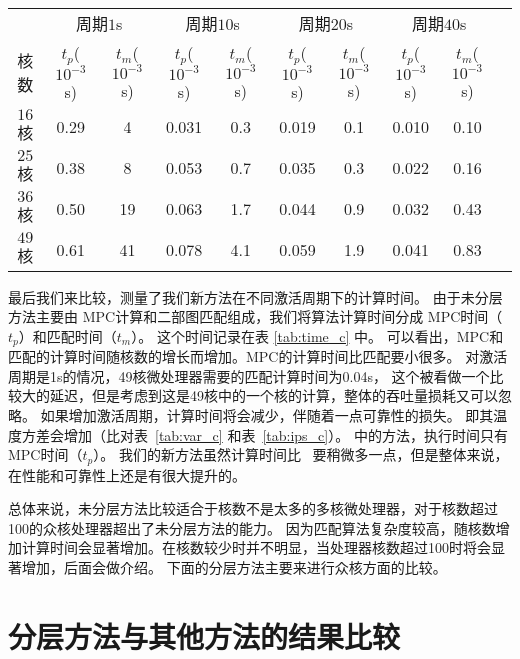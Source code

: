    \begin{table*}
\tabcolsep=1pt
\small
 \centering
 \caption{未分层方法与其他方法的计算时间比较}~\label{tab:time_c} 
 \begin{tabular}{|c|c|c|c|c|c|c|c|c|c|}
 \hline
 \hline
	        & \multicolumn{2}{c|}{周期$1$s} & \multicolumn{2}{c|}{周期$10$s} & \multicolumn{2}{c|}{周期$20$s} & \multicolumn{2}{c|}{周期$40$s}\\
核数	& $t_p$($10^{-3}$s) &$t_m$($10^{-3}$s) &$t_p$($10^{-3}$s) &$t_m$($10^{-3}$s) & $t_p$($10^{-3}$s)  & $t_m$($10^{-3}$s) & $t_p$($10^{-3}$s)  & $t_m$($10^{-3}$s)\\
 \hline 
 \hline
 $16$ 核 & 0.29 & 4 & 0.031 & 0.3 & 0.019 & 0.1 & 0.010 & 0.10 \\
 \hline
 $25$ 核 & 0.38 & 8 & 0.053 & 0.7 & 0.035 & 0.3 & 0.022 & 0.16 \\
 \hline
 $36$ 核 & 0.50 & 19 & 0.063 & 1.7 & 0.044 & 0.9 & 0.032 & 0.43 \\
 \hline
 $49$ 核 & 0.61 & 41 & 0.078 & 4.1 & 0.059 & 1.9 & 0.041 & 0.83 \\
 \hline
 \hline
 \end{tabular}
 \end{table*}
 
 最后我们来比较，测量了我们新方法在不同激活周期下的计算时间。
 由于未分层方法主要由 MPC计算和二部图匹配组成，我们将算法计算时间分成 MPC时间（$t_p$）和匹配时间（$t_m$）。
 这个时间记录在表 \ref{tab:time_c} 中。
 可以看出，MPC和匹配的计算时间随核数的增长而增加。MPC的计算时间比匹配要小很多。
 对激活周期是1s的情况，49核微处理器需要的匹配计算时间为0.04s，
 这个被看做一个比较大的延迟，但是考虑到这是49核中的一个核的计算，整体的吞吐量损耗又可以忽略。
 如果增加激活周期，计算时间将会减少，伴随着一点可靠性的损失。
 即其温度方差会增加（比对表~\ref{tab:var_c} 和表~\ref{tab:ips_c}）。
 \cite{Zanini:ECCTD'09}中的方法，执行时间只有MPC时间（$t_p$）。
 我们的新方法虽然计算时间比~\cite{Zanini:ECCTD'09} 要稍微多一点，但是整体来说，在性能和可靠性上还是有很大提升的。
 
 总体来说，未分层方法比较适合于核数不是太多的多核微处理器，对于核数超过100的众核处理器超出了未分层方法的能力。
 因为匹配算法复杂度较高，随核数增加计算时间会显著增加。在核数较少时并不明显，当处理器核数超过100时将会显著增加，后面会做介绍。
 下面的分层方法主要来进行众核方面的比较。
 
 
 


 

\section{分层方法与其他方法的结果比较}\label{sec:result_h}

